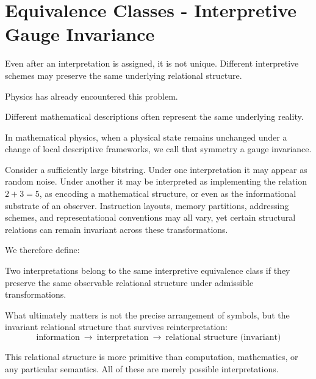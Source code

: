\section{Equivalence Classes - Interpretive Gauge Invariance}

Even after an interpretation is assigned, it is not unique.
Different interpretive schemes may preserve the same underlying relational structure.

Physics has already encountered this problem.

Different mathematical descriptions often represent the same underlying reality.

In mathematical physics, when a physical state remains unchanged under a change of local descriptive frameworks, we call that symmetry a gauge invariance.

Consider a sufficiently large bitstring.
Under one interpretation it may appear as random noise.
Under another it may be interpreted as implementing the relation $2 + 3 = 5$, as encoding a mathematical structure, or even as the informational substrate of an observer.
Instruction layouts, memory partitions, addressing schemes, and representational conventions may all vary, yet certain structural relations can remain invariant across these transformations.

We therefore define:

\begin{tcolorbox}[title=Interpretive Equivalence Class]
Two interpretations belong to the same interpretive equivalence class if they preserve the same observable relational structure under admissible transformations.
\end{tcolorbox}

What ultimately matters is not the precise arrangement of symbols, but the invariant relational structure that survives reinterpretation:
\[
\text{information} \ \longrightarrow \ \text{interpretation} \ \longrightarrow \ \text{relational structure (invariant)}
\]

This relational structure is more primitive than computation, mathematics, or any particular semantics.
All of these are merely possible interpretations.


